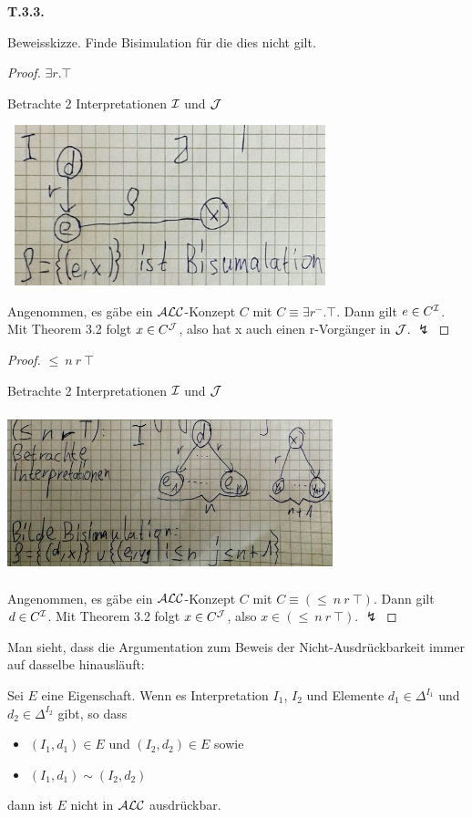 \textbf{T.3.3.}

Beweisskizze. Finde Bisimulation für die dies nicht gilt.

\begin{proof}
\textbf{$\exists r.\top$}

Betrachte 2 Interpretationen $\mathcal{I}$ und $\mathcal{J}$

\includegraphics[width=3.71910in,height=1.83200in]{media/33inv.png}

Angenommen, es gäbe ein $\mathcal{A}\mathcal{L}\mathcal{C}$-Konzept $C$ mit $C \equiv \exists r^{-}.\top$. Dann gilt $e \in C^{\mathcal{I}}$. Mit Theorem 3.2 folgt $x \in C^{\mathcal{J}}$, also hat x auch einen r-Vorgänger in $\mathcal{J}$. $\lightning$
\end{proof} 

\begin{proof}
$\leq\ n\ r\ \top$

Betrachte 2 Interpretationen $\mathcal{I}$ und $\mathcal{J}$

\includegraphics[width=3.71910in,height=1.83200in]{media/33low.png}

Angenommen, es gäbe ein $\mathcal{A}\mathcal{L}\mathcal{C}$-Konzept $C$ mit $C \equiv (\leq\ n\ r\ \top)$. Dann gilt $d \in C^{\mathcal{I}}$. Mit Theorem 3.2 folgt $x \in C^{\mathcal{J}}$, also $x \in (\leq\ n\ r\ \top)$. $\lightning$
\end{proof}

Man sieht, dass die Argumentation zum Beweis der Nicht-Ausdrückbarkeit immer auf dasselbe hinausläuft:
\begin{theorem}

Sei $E$ eine Eigenschaft. Wenn es Interpretation $I_{1}$, $I_{2}$
und Elemente $d_{1} \in \Delta^{I_{1}}$ und
$d_{2} \in \Delta^{I_{2}}$ gibt, so dass

\begin{itemize}
\item
  $\left( I_{1},d_{1} \right) \in E$ und
  $\left( I_{2},d_{2} \right) \in E$ sowie
\item
  $(I_{1},d_{1}) \sim (I_{2},d_{2})$
\end{itemize}

dann ist $E$ nicht in $\mathcal{A}\mathcal{L}\mathcal{C}$ ausdrückbar.
\end{theorem}

